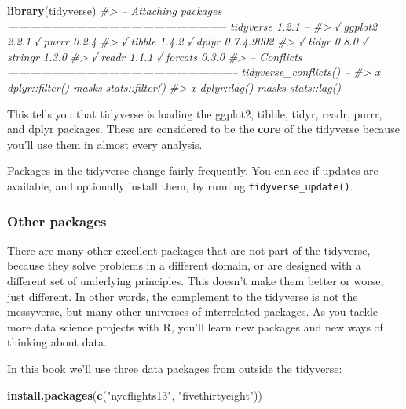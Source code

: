 \documentclass[]{book}
\newenvironment{Shaded}{\begin{snugshade}}{\end{snugshade}}
\newcommand{\KeywordTok}[1]{\textcolor[rgb]{0.13,0.29,0.53}{\textbf{#1}}}
\newcommand{\StringTok}[1]{\textcolor[rgb]{0.31,0.60,0.02}{#1}}
\newcommand{\CommentTok}[1]{\textcolor[rgb]{0.56,0.35,0.01}{\textit{#1}}}
\newcommand{\NormalTok}[1]{#1}
\theoremstyle{definition}
\theoremstyle{definition}
\theoremstyle{definition}
\theoremstyle{remark}
\begin{document}
\begin{Shaded}
\begin{Highlighting}[]
\KeywordTok{library}\NormalTok{(tidyverse)}
\CommentTok{#> -- Attaching packages ----------------------------------------------------------- tidyverse 1.2.1 --}
\CommentTok{#> √ ggplot2 2.2.1          √ purrr   0.2.4     }
\CommentTok{#> √ tibble  1.4.2          √ dplyr   0.7.4.9002}
\CommentTok{#> √ tidyr   0.8.0          √ stringr 1.3.0     }
\CommentTok{#> √ readr   1.1.1          √ forcats 0.3.0}
\CommentTok{#> -- Conflicts -------------------------------------------------------------- tidyverse_conflicts() --}
\CommentTok{#> x dplyr::filter() masks stats::filter()}
\CommentTok{#> x dplyr::lag()    masks stats::lag()}
\end{Highlighting}
\end{Shaded}

This tells you that tidyverse is loading the ggplot2, tibble, tidyr,
readr, purrr, and dplyr packages. These are considered to be the
\textbf{core} of the tidyverse because you'll use them in almost every
analysis.

Packages in the tidyverse change fairly frequently. You can see if
updates are available, and optionally install them, by running
\texttt{tidyverse\_update()}.

\subsubsection{Other packages}\label{other-packages}

There are many other excellent packages that are not part of the
tidyverse, because they solve problems in a different domain, or are
designed with a different set of underlying principles. This doesn't
make them better or worse, just different. In other words, the
complement to the tidyverse is not the messyverse, but many other
universes of interrelated packages. As you tackle more data science
projects with R, you'll learn new packages and new ways of thinking
about data.

In this book we'll use three data packages from outside the tidyverse:

\begin{Shaded}
\begin{Highlighting}[]
\KeywordTok{install.packages}\NormalTok{(}\KeywordTok{c}\NormalTok{(}\StringTok{"nycflights13"}\NormalTok{, }\StringTok{"fivethirtyeight"}\NormalTok{))}
\end{Highlighting}
\end{Shaded}
\end{document}
